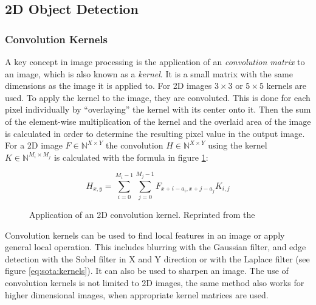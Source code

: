 \subsection{2D Object Detection}

\subsubsection{Convolution Kernels}

A key concept in image processing is the application of an \emph{convolution matrix} to an image, which is also known as a \emph{kernel}. 
It is a small matrix with the same dimensions as the image it is applied to. 
For \ac{2D} images $ 3 \times 3 $ or $5 \times 5 $ kernels are used. 
To apply the kernel to the image, they are convoluted.
This is done for each pixel individually by \enquote{overlaying} the kernel with its center onto it. 
Then the sum of the element-wise multiplication of the kernel and the overlaid area of the image is calculated in order to determine the resulting pixel value in the output image.
For a \ac{2D} image $ F \in \mathbb{N}^{X \times Y} $ the convolution $ H \in \mathbb{N}^{X \times Y} $ using the kernel $ K \in \mathbb{N}^{M_i \times M_j} $ is calculated with the formula in figure \ref{eq:sota:convolution}:

\begin{figure}[h!]
\begin{equation*}
H_{x,y} = \sum_{i=0}^{M_i-1} \sum_{j=0}^{M_j-1} F_{x+i-a_i, x+j-a_j}K_{i,j}
\end{equation*}
\caption[Application of an 2D convolution kernel]{Application of an 2D convolution kernel. Reprinted from the \textcite[][]{opencv2018kernel}}
\label{eq:sota:convolution}
\end{figure}

Convolution kernels can be used to find local features in an image or apply general local operation.
This includes blurring with the Gaussian filter, and edge detection with the Sobel filter in X and Y direction or with the Laplace filter (see figure \ref{eq:sota:kernels}).
It can also be used to sharpen an image. 
The use of convolution kernels is not limited to \ac{2D} images, 
the same method also works for higher dimensional images, 
when appropriate kernel matrices are used.

